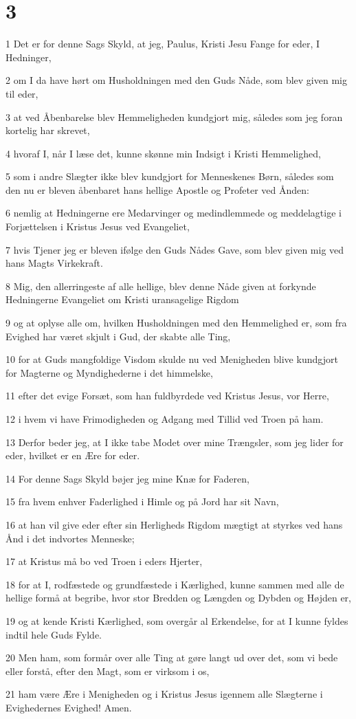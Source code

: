 \chapter{3}

\par 1 Det er for denne Sags Skyld, at jeg, Paulus, Kristi Jesu Fange for eder, I Hedninger,
\par 2 om I da have hørt om Husholdningen med den Guds Nåde, som blev given mig til eder,
\par 3 at ved Åbenbarelse blev Hemmeligheden kundgjort mig, således som jeg foran kortelig har skrevet,
\par 4 hvoraf I, når I læse det, kunne skønne min Indsigt i Kristi Hemmelighed,
\par 5 som i andre Slægter ikke blev kundgjort for Menneskenes Børn, således som den nu er bleven åbenbaret hans hellige Apostle og Profeter ved Ånden:
\par 6 nemlig at Hedningerne ere Medarvinger og medindlemmede og meddelagtige i Forjættelsen i Kristus Jesus ved Evangeliet,
\par 7 hvis Tjener jeg er bleven ifølge den Guds Nådes Gave, som blev given mig ved hans Magts Virkekraft.
\par 8 Mig, den allerringeste af alle hellige, blev denne Nåde given at forkynde Hedningerne Evangeliet om Kristi uransagelige Rigdom
\par 9 og at oplyse alle om, hvilken Husholdningen med den Hemmelighed er, som fra Evighed har været skjult i Gud, der skabte alle Ting,
\par 10 for at Guds mangfoldige Visdom skulde nu ved Menigheden blive kundgjort for Magterne og Myndighederne i det himmelske,
\par 11 efter det evige Forsæt, som han fuldbyrdede ved Kristus Jesus, vor Herre,
\par 12 i hvem vi have Frimodigheden og Adgang med Tillid ved Troen på ham.
\par 13 Derfor beder jeg, at I ikke tabe Modet over mine Trængsler, som jeg lider for eder, hvilket er en Ære for eder.
\par 14 For denne Sags Skyld bøjer jeg mine Knæ for Faderen,
\par 15 fra hvem enhver Faderlighed i Himle og på Jord har sit Navn,
\par 16 at han vil give eder efter sin Herligheds Rigdom mægtigt at styrkes ved hans Ånd i det indvortes Menneske;
\par 17 at Kristus må bo ved Troen i eders Hjerter,
\par 18 for at I, rodfæstede og grundfæstede i Kærlighed, kunne sammen med alle de hellige formå at begribe, hvor stor Bredden og Længden og Dybden og Højden er,
\par 19 og at kende Kristi Kærlighed, som overgår al Erkendelse, for at I kunne fyldes indtil hele Guds Fylde.
\par 20 Men ham, som formår over alle Ting at gøre langt ud over det, som vi bede eller forstå, efter den Magt, som er virksom i os,
\par 21 ham være Ære i Menigheden og i Kristus Jesus igennem alle Slægterne i Evighedernes Evighed! Amen.

